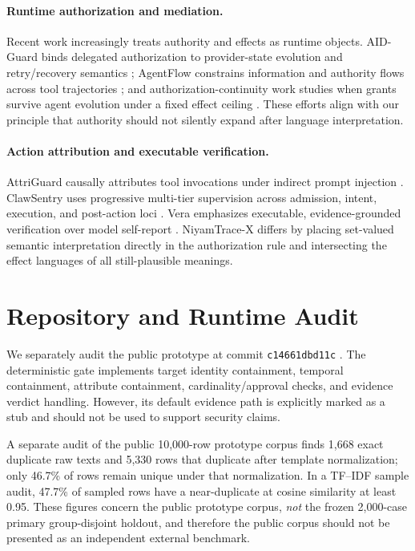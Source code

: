 \paragraph{Runtime authorization and mediation.}
Recent work increasingly treats authority and effects as runtime objects. AID-Guard binds delegated authorization to provider-state evolution and retry/recovery semantics \cite{aidguard2026}; AgentFlow constrains information and authority flows across tool trajectories \cite{agentflow2026}; and authorization-continuity work studies when grants survive agent evolution under a fixed effect ceiling \cite{authcontinuity2026}. These efforts align with our principle that authority should not silently expand after language interpretation.

\paragraph{Action attribution and executable verification.}
AttriGuard causally attributes tool invocations under indirect prompt injection \cite{attriguard2026}. ClawSentry uses progressive multi-tier supervision across admission, intent, execution, and post-action loci \cite{clawsentry2026}. Vera emphasizes executable, evidence-grounded verification over model self-report \cite{vera2026}. NiyamTrace-X differs by placing set-valued semantic interpretation directly in the authorization rule and intersecting the effect languages of all still-plausible meanings.

\section{Repository and Runtime Audit}
\label{sec:audit}

We separately audit the public prototype at commit \texttt{c14661dbd11c} \cite{niyamtrace_repo}. The deterministic gate implements target identity containment, temporal containment, attribute containment, cardinality/approval checks, and evidence verdict handling. However, its default evidence path is explicitly marked as a stub and should not be used to support security claims.

A separate audit of the public 10,000-row prototype corpus finds 1,668 exact duplicate raw texts and 5,330 rows that duplicate after template normalization; only 46.7\% of rows remain unique under that normalization. In a TF--IDF sample audit, 47.7\% of sampled rows have a near-duplicate at cosine similarity at least 0.95. These figures concern the public prototype corpus, \emph{not} the frozen 2,000-case primary group-disjoint holdout, and therefore the public corpus should not be presented as an independent external benchmark.

